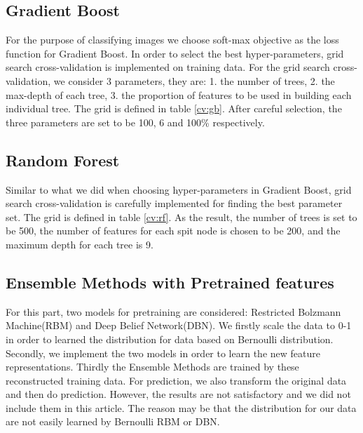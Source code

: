 \documentclass[11pt,oneside,a4paper]{article}
\numberwithin{equation}{section}
\begin{document}
\subsection{Gradient Boost}

For the purpose of classifying images we choose soft-max objective as the loss function for Gradient Boost. In order to select the best hyper-parameters, grid search cross-validation is implemented on training data. For the grid search cross-validation, we consider 3 parameters, they are: 1. the number of trees, 2. the max-depth of each tree, 3. the proportion of features to be used in building each individual tree. The grid is defined in table \ref{cv:gb}. After careful selection, the three parameters are set to be 100, 6 and 100\% respectively.

\subsection{Random Forest}

Similar to what we did when choosing hyper-parameters in Gradient Boost, grid search cross-validation is carefully implemented for finding the best parameter set. The grid is defined in table \ref{cv:rf}. As the result, the number of trees is set to be 500, the number of features for each spit node is chosen to be 200, and the maximum depth for each tree is 9.

\subsection{Ensemble Methods with Pretrained features}
For this part, two models for pretraining are considered: Restricted Bolzmann Machine(RBM) and Deep Belief Network(DBN). We firstly scale the data to 0-1 in order to learned the distribution for data based on Bernoulli distribution. Secondly, we implement the two models in order to learn the new feature representations. Thirdly the Ensemble Methods are trained by these reconstructed training data. For prediction, we also transform the original data and then do prediction. However, the results are not satisfactory and we did not include them in this article. The reason may be that the distribution for our data are not easily learned by Bernoulli RBM or DBN.
\end{document}

